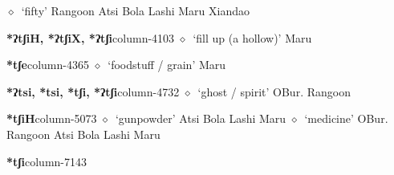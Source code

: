          $\diamond$~`fifty'
         Rangoon 
\hspace{1ex}
         Atsi 
\hspace{1ex}
         Bola 
\hspace{1ex}
         Lashi 
\hspace{1ex}
         Maru 
\hspace{1ex}
         Xiandao 
  \item {\footnotesize \textbf{*ʔtʃiH, *ʔtʃiX, *ʔtʃi}}{\tiny column-4103}
         $\diamond$~`fill up (a hollow)'
         Maru 
  \item {\footnotesize \textbf{*tʃe}}{\tiny column-4365}
         $\diamond$~`foodstuff / grain'
         Maru 
  \item {\footnotesize \textbf{*ʔtsi, *tsi, *tʃi, *ʔtʃi}}{\tiny column-4732}
         $\diamond$~`ghost / spirit'
         OBur. 
\hspace{1ex}
         Rangoon 
  \item {\footnotesize \textbf{*tʃiH}}{\tiny column-5073}
         $\diamond$~`gunpowder'
         Atsi 
\hspace{1ex}
         Bola 
\hspace{1ex}
         Lashi 
\hspace{1ex}
         Maru 
\hspace{1ex}
         $\diamond$~`medicine'
         OBur. 
\hspace{1ex}
         Rangoon 
\hspace{1ex}
         Atsi 
\hspace{1ex}
         Bola 
\hspace{1ex}
         Lashi 
\hspace{1ex}
         Maru 
  \item {\footnotesize \textbf{*tʃi}}{\tiny column-7143}

